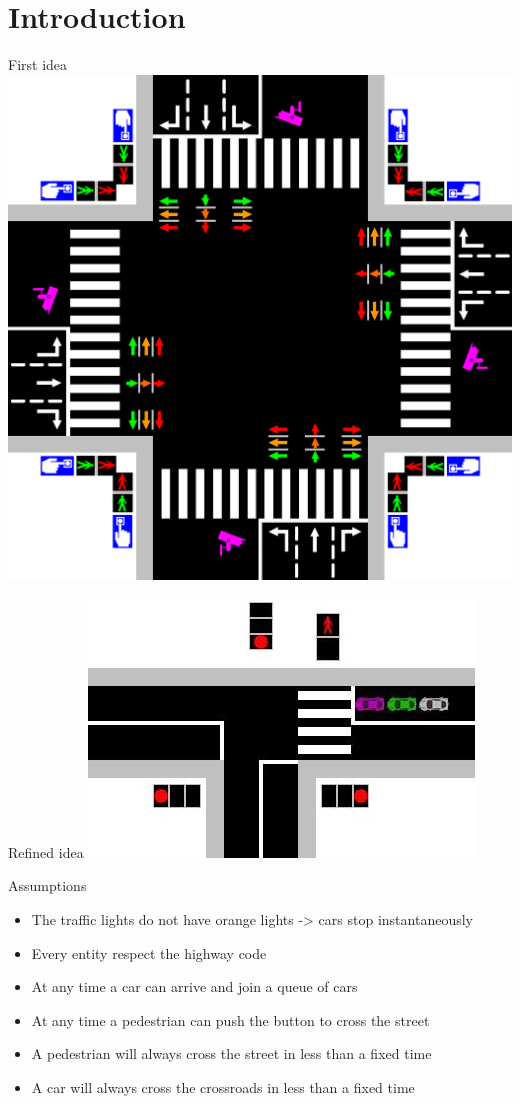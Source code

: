 \documentclass{bredelebeamer}
\begin{document}
\section{Introduction}
\begin{frame}{First idea}
\centering
\includegraphics[scale=0.15]{images/idea_draft.png}
\end{frame}
\begin{frame}{Refined idea}
\centering
\includegraphics[scale=0.8]{images/final_idea.png}
\end{frame}

\begin{frame}{Assumptions}
\begin{itemize}
\item The traffic lights do not have orange lights -> cars stop instantaneously
\item Every entity respect the highway code 
\item At any time a car can arrive and join a queue of cars
\item At any time a pedestrian can push the button to cross the street
\item A pedestrian will always cross the street in less than a fixed time
\item A car will always cross the crossroads in less than a fixed time
\end{itemize}
\end{frame}
\end{document}
